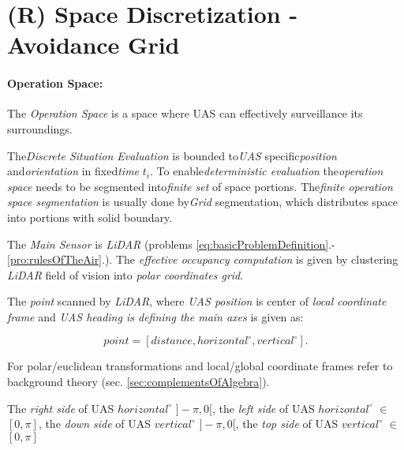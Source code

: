 \setcounter{chapter}{6}
\setcounter{section}{7}
\setcounter{subsection}{3}
\newpage
\section{(R) Space Discretization - Avoidance Grid}\label{s:AvoidanceGrid}

\paragraph{Operation Space:} The \emph{Operation Space} is a space where UAS can effectively surveillance its surroundings.

The\emph{Discrete Situation Evaluation} is bounded to\emph{UAS} specific\emph{position} and\emph{orientation} in fixed\emph{time} $t_i$. To enable\emph{deterministic evaluation} the\emph{operation space} needs to be segmented into\emph{finite set} of space portions. The\emph{finite operation space segmentation} is usually done by\emph{Grid} segmentation, which distributes space into portions with solid boundary.

The \emph{Main Sensor} is \emph{LiDAR} (problems \ref{eq:basicProblemDefinition}.-\ref{pro:rulesOfTheAir}.). The \emph{effective occupancy computation} \cite{homm2010efficient} is given by clustering \emph{LiDAR} field of vision into \emph{polar coordinates grid}.

The \emph{point} scanned by \emph{LiDAR}, where \emph{UAS position} is center of \emph{local coordinate frame} and \emph{UAS heading is defining the main axes} is given as:

\begin{equation*}
    point = [distance,horizontal^\circ,vertical^\circ].
\end{equation*}

\begin{note}
    For polar/euclidean transformations and local/global coordinate frames refer to background theory (sec. \ref{sec:complementsOfAlgebra}). 
    
    The \emph{right side} of UAS $horizontal^\circ$ $]-\pi,0[$, the \emph{left side} of UAS $horizontal^\circ$ $\in$ $[0,\pi]$, the \emph{down side} of UAS $vertical^\circ$ $]-\pi,0[$, the \emph{top side} of UAS $vertical^\circ$ $\in$ $[0,\pi]$
\end{note}


